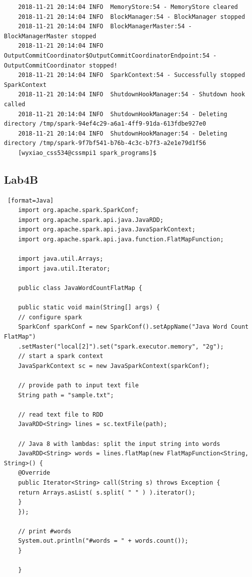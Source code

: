 \documentclass[11pt, letterpaper]{article}
\begin{document}
\begin{lstlisting}
	2018-11-21 20:14:04 INFO  MemoryStore:54 - MemoryStore cleared
	2018-11-21 20:14:04 INFO  BlockManager:54 - BlockManager stopped
	2018-11-21 20:14:04 INFO  BlockManagerMaster:54 - BlockManagerMaster stopped
	2018-11-21 20:14:04 INFO  OutputCommitCoordinator$OutputCommitCoordinatorEndpoint:54 - OutputCommitCoordinator stopped!
	2018-11-21 20:14:04 INFO  SparkContext:54 - Successfully stopped SparkContext
	2018-11-21 20:14:04 INFO  ShutdownHookManager:54 - Shutdown hook called
	2018-11-21 20:14:04 INFO  ShutdownHookManager:54 - Deleting directory /tmp/spark-94ef4c29-a6a1-4ff9-91da-613fdbe927e0
	2018-11-21 20:14:04 INFO  ShutdownHookManager:54 - Deleting directory /tmp/spark-9f7bf541-b76b-4c3c-b7f3-a2e1e79d1f56
	[wyxiao_css534@cssmpi1 spark_programs]$
	\end{lstlisting}
	
	\subsection{Lab4B}
	
	\begin{lstlisting} [format=Java]
	import org.apache.spark.SparkConf;
	import org.apache.spark.api.java.JavaRDD;
	import org.apache.spark.api.java.JavaSparkContext;
	import org.apache.spark.api.java.function.FlatMapFunction;
	
	import java.util.Arrays;
	import java.util.Iterator;
	
	public class JavaWordCountFlatMap {
	
	public static void main(String[] args) {
	// configure spark
	SparkConf sparkConf = new SparkConf().setAppName("Java Word Count FlatMap")
	.setMaster("local[2]").set("spark.executor.memory", "2g");
	// start a spark context
	JavaSparkContext sc = new JavaSparkContext(sparkConf);
	
	// provide path to input text file
	String path = "sample.txt";
	
	// read text file to RDD
	JavaRDD<String> lines = sc.textFile(path);
	
	// Java 8 with lambdas: split the input string into words
	JavaRDD<String> words = lines.flatMap(new FlatMapFunction<String, String>() {
	@Override
	public Iterator<String> call(String s) throws Exception {
	return Arrays.asList( s.split( " " ) ).iterator();
	}
	});
	
	// print #words
	System.out.println("#words = " + words.count());
	}
	
	}
	\end{lstlisting}
	
\end{document}
